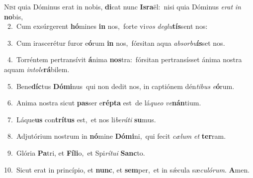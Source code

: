 \lettrine{\initial\textcolor{\initialcolor}{N}}{isi} quia Dóminus erat in nobis, \textbf{di}\-cat nunc \textbf{Is}\-\textbf{ra}ël:~\star nisi quia Dóminus \textit{e}\-\textit{rat} \textit{in} \textbf{no}\-bis,\\
{\numbfont\textcolor{\numbcolor}{~2.}}~Cum exsúrgerent \textbf{hó}\-mines \textbf{in} nos,~\star forte vi\textit{vos} \textit{de}\-\textit{glu}\textbf{tís}sent nos:\par
{\numbfont\textcolor{\numbcolor}{~3.}}~Cum irascerétur furor e\-\textbf{ó}\-rum \textbf{in} nos,~\star fórsitan aqua \textit{ab}\-\textit{sor}\textit{bu}\textbf{ís}set nos.\par
{\numbfont\textcolor{\numbcolor}{~4.}}~Torréntem pertransívit \textbf{á}\-nima \textbf{nos}\-tra:~\star fórsitan pertransísset ánima nostra aquam \textit{in}\-\textit{to}\textit{le}\textbf{rá}bilem.\par
{\numbfont\textcolor{\numbcolor}{~5.}}~Bene\-\textbf{díc}\-tus \textbf{Dó}\-\textbf{mi}nus~\star qui non dedit nos, in captiónem dén\-\textit{ti}\-\textit{bus} \textit{e}\-\textbf{ó}rum.\par
{\numbfont\textcolor{\numbcolor}{~6.}}~Anima nostra sicut \textbf{pas}\-ser e\-\textbf{rép}\-\textbf{ta} est~\star de lá\-\textit{que}\-\textit{o} \textit{ve}\-\textbf{nán}tium.\par
{\numbfont\textcolor{\numbcolor}{~7.}}~Láque\textbf{us} con\-\textbf{trí}\-\textbf{tus} est,~\star et nos li\-\textit{be}\-\textit{rá}\textit{ti} \textbf{su}\-mus.\par
{\numbfont\textcolor{\numbcolor}{~8.}}~Adjutórium nostrum in \textbf{nó}\-mine \textbf{Dó}\-\textbf{mi}ni,~\star qui fecit \textit{cæ}\-\textit{lum} \textit{et} \textbf{ter}\-ram.\par
{\numbfont\textcolor{\numbcolor}{~9.}}~Glória \textbf{Pa}\-tri, et \textbf{Fí}\-\textbf{li}o,~\star et Spi\-\textit{rí}\-\textit{tu}\textit{i} \textbf{Sanc}\-to.\par
{\numbfont\textcolor{\numbcolor}{10.}}~Sicut erat in princípio, et \textbf{nunc}\-, et \textbf{sem}\-per,~\star et in sǽcula sæ\-\textit{cu}\-\textit{ló}\textit{rum}. \textbf{A}\-men.\par
